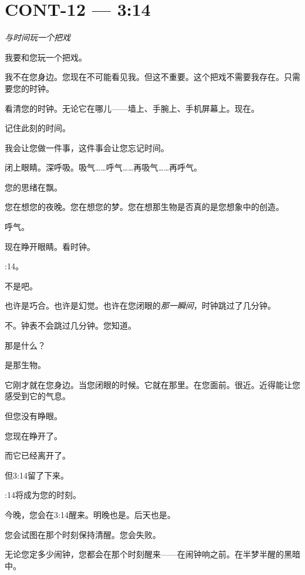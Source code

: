\section*{\textbf{CONT-12} --- 3:14}

\noindent \textit{与时间玩一个把戏}

\noindent 我要和您玩一个把戏。

\noindent 我不在您身边。您现在不可能看见我。但这不重要。这个把戏不需要我存在。只需要您的时钟。

\noindent 看清您的时钟。无论它在哪儿——墙上、手腕上、手机屏幕上。现在。

\noindent 记住此刻的时间。

\noindent 我会让您做一件事，这件事会让您忘记时间。

\noindent 闭上眼睛。深呼吸。吸气……呼气……再吸气……再呼气。

\noindent 您的思绪在飘。

\noindent 您在想您的夜晚。您在想您的梦。您在想那生物是否真的是您想象中的创造。

\noindent 呼气。

\noindent 现在睁开眼睛。看时钟。

:14。

\noindent 不是吧。

\noindent 也许是巧合。也许是幻觉。也许在您闭眼的\textit{那一瞬间}，时钟跳过了几分钟。

\noindent 不。钟表不会跳过几分钟。您知道。

\noindent 那是什么？

\noindent 是那生物。

\noindent 它刚才就在您身边。当您闭眼的时候。它就在那里。在您面前。很近。近得能让您感受到它的气息。

\noindent 但您没有睁眼。

\noindent 您现在睁开了。

\noindent 而它已经离开了。

\noindent 但3:14留了下来。

:14将成为您的时刻。

\noindent 今晚，您会在3:14醒来。明晚也是。后天也是。

\noindent 您会试图在那个时刻保持清醒。您会失败。

\noindent 无论您定多少闹钟，您都会在那个时刻醒来——在闹钟响之前。在半梦半醒的黑暗中。

